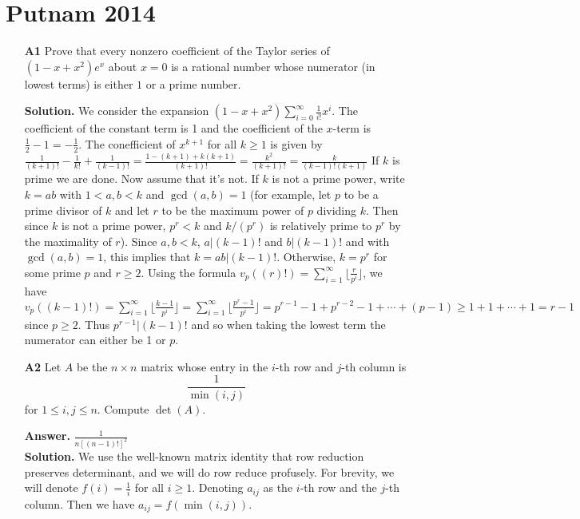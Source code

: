 \documentclass[11pt,a4paper]{article}
\begin{document}
\section{Putnam 2014}
\begin{enumerate}
	\item [\textbf{A1}]Prove that every nonzero coefficient of the Taylor series of $(1-x+x^2)e^x$ about $x=0$ is a rational number whose numerator (in lowest terms) is either $1$ or a prime number.
	
	\textbf{Solution.} We consider the expansion $(1-x+x^2)\displaystyle\sum_{i=0}^{\infty} \frac{1}{i!}x^i$. The coefficient of the constant term is 1 and the coefficient of the $x$-term is $\frac{1}{2}-1=-\frac{1}{2}$. The conefficient of $x^{k+1}$ for all $k\ge 1$ is given by $\frac{1}{(k+1)!}-\frac{1}{k!}+\frac{1}{(k-1)!}
	=\frac{1-(k+1)+k(k+1)}{(k+1)!}
	=\frac{k^2}{(k+1)!}
	=\frac{k}{(k-1)!(k+1)}
	$
	If $k$ is prime we are done. 
	Now assume that it's not. If $k$ is not a prime power, write $k=ab$ with $1<a, b<k$ and $\gcd(a, b)=1$ (for example, let $p$ to be a prime divisor of $k$ and let $r$ to be the maximum power of $p$ dividing $k$. Then since $k$ is not a prime power, $p^r<k$ and $k/(p^r)$ is relatively prime to $p^r$ by the maximality of $r$). Since $a, b<k$, $a|(k-1)!$ and $b|(k-1)!$ and with $\gcd(a, b)=1$, this implies that $k=ab|(k-1)!$. Otherwise, $k=p^r$ for some prime $p$ and $r\ge 2$. Using the formula $v_p((r)!)=\sum_{i=1}^\infty\lfloor\frac{r}{p^i}\rfloor$, we have 
	$v_p((k-1)!)=\sum_{i=1}^\infty\lfloor\frac{k-1}{p^i}\rfloor
	=\sum_{i=1}^\infty\lfloor\frac{p^r-1}{p^i}\rfloor
	=p^{r-1}-1+p^{r-2}-1+\cdots + (p-1)
	\ge 1+1+\cdots + 1
	= r-1
	$
	since $p\ge 2$. Thus $p^{r-1}|(k-1)!$ and so when taking the lowest term the numerator can either be 1 or $p$. 
	
	\item[\textbf{A2}]Let $A$ be the $n\times n$ matrix whose entry in the $i$-th row and $j$-th column is \[\frac1{\min(i,j)}\] for $1\le i,j\le n.$ Compute $\det(A).$
	
	\textbf{Answer.} $\frac{1}{n[(n-1)!]^2}$\\
	\textbf{Solution.} We use the well-known matrix identity that row reduction preserves determinant, and we will do row reduce profusely. For brevity, we will denote $f(i)=\frac{1}{i}$ for all $i\ge 1$. Denoting $a_{ij}$ as the $i$-th row and the $j$-th column. Then we have $a_{ij}=f(\min(i, j))$. 
	

\end{enumerate}
\end{document}
